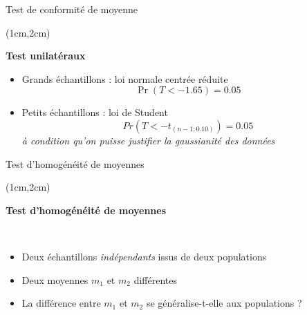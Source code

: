 \documentclass{beamer}
\begin{document}



\begin{frame}{Test de conformité de moyenne}
\begin{textblock*}{\textwidth}(1cm,2cm)

\begin{center}{\bf \Large Test unilatéraux  } \end{center}

\begin{itemize}
\item Grands échantillons : loi normale centrée réduite 
$$\Pr(T<-1.65)=0.05$$

\item Petits échantillons : loi de Student 
$$
Pr(T<-t_{(n-1;0.10)})=0.05
$$
\emph{à condition qu'on puisse justifier la gaussianité des données}
\end{itemize}



\end{textblock*}
\end{frame}



\begin{frame}{Test d'homogénéité de moyennes}
\begin{textblock*}{\textwidth}(1cm,2cm)

\begin{center}{\bf \Large Test d'homogénéité de moyennes } \end{center}

\

\begin{itemize}
\item Deux échantillons {\it indépendants} issus de deux populations
\item Deux moyennes $m_1$ et $m_2$ différentes
\item La différence entre $m_1$ et $m_2$ se généralise-t-elle aux populations ?
\end{itemize}

\end{textblock*}
\end{frame}

\end{document}
